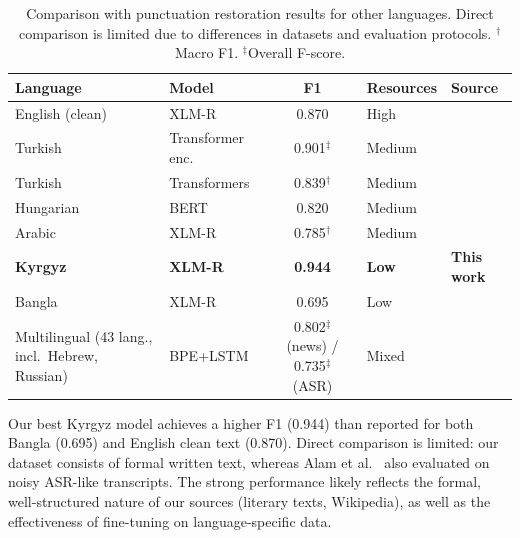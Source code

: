 \documentclass[manuscript, review]{acmart}
\begin{document}
\begin{table}[t]
\caption{Comparison with punctuation restoration results for other languages. Direct comparison is limited due to differences in datasets and evaluation protocols. $^{\dagger}$Macro F1. $^{\ddagger}$Overall F-score.}
\label{tab:crosslingual}
\begin{tabular}{llcll}
\toprule
\textbf{Language} & \textbf{Model} & \textbf{F1} & \textbf{Resources} & \textbf{Source} \\
\midrule
English (clean) & XLM-R            & 0.870              & High   & \cite{alam2020punctuation} \\
Turkish         & Transformer enc.\ & 0.901$^{\ddagger}$ & Medium & \cite{gormez2025turkish} \\
Turkish         & Transformers     & 0.839$^{\dagger}$  & Medium & \cite{kurt2023turkish} \\
Hungarian       & BERT             & 0.820              & Medium & \cite{nagy2021punctuation} \\
Arabic          & XLM-R            & 0.785$^{\dagger}$  & Medium & \cite{sakr2023arapunc} \\
\textbf{Kyrgyz} & \textbf{XLM-R}   & \textbf{0.944}     & \textbf{Low} & \textbf{This work} \\
Bangla          & XLM-R            & 0.695              & Low    & \cite{alam2020punctuation} \\
Multilingual (43 lang., incl.\ Hebrew, Russian) & BPE+LSTM & 0.802$^{\ddagger}$ (news) / 0.735$^{\ddagger}$ (ASR) & Mixed & \cite{li2020multilingual} \\
\bottomrule
\end{tabular}
\end{table}

Our best Kyrgyz model achieves a higher F1 (0.944) than reported for both Bangla (0.695) and English clean text (0.870). Direct comparison is limited: our dataset consists of formal written text, whereas Alam et al.~\cite{alam2020punctuation} also evaluated on noisy ASR-like transcripts. The strong performance likely reflects the formal, well-structured nature of our sources (literary texts, Wikipedia), as well as the effectiveness of fine-tuning on language-specific data.
\end{document}
